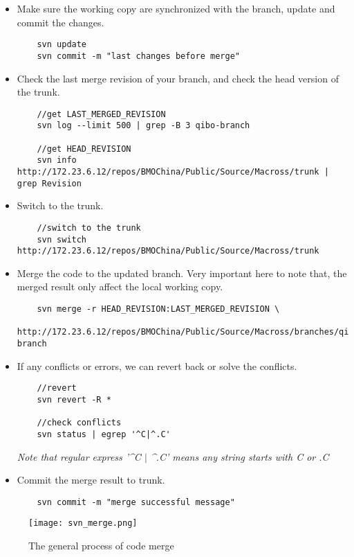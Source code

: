 \begin{itemize}
\item 
	Make sure the working copy are synchronized with the branch, update and commit the changes.
	\begin{lstlisting}
	svn update 
	svn commit -m "last changes before merge"
	\end{lstlisting}

\item 
	Check the last merge revision of your branch, and check the head version of the trunk.
	\begin{lstlisting}
	//get LAST_MERGED_REVISION
	svn log --limit 500 | grep -B 3 qibo-branch
	
	//get HEAD_REVISION 											  
	svn info http://172.23.6.12/repos/BMOChina/Public/Source/Macross/trunk | grep Revision  
	\end{lstlisting}

\item
	Switch to the trunk.
	\begin{lstlisting}
	//switch to the trunk
	svn switch http://172.23.6.12/repos/BMOChina/Public/Source/Macross/trunk	
	\end{lstlisting}

\item
	Merge the code to the updated branch. Very important here to note that, the merged result only affect the local working copy.
	\begin{lstlisting}
	svn merge -r HEAD_REVISION:LAST_MERGED_REVISION \
	  http://172.23.6.12/repos/BMOChina/Public/Source/Macross/branches/qibo-branch
	\end{lstlisting}

\item
	If any conflicts or errors, we can revert back or solve the conflicts.
	\begin{lstlisting}
	//revert	
	svn revert -R *
	
	//check conflicts
	svn status | egrep '^C|^.C'
	\end{lstlisting}
	\textit{Note that regular express '\^{}C $\vert$ \^{}.C' means any string starts with C or .C}

\item
	Commit the merge result to trunk.
	\begin{lstlisting}
	svn commit -m "merge successful message"
	\end{lstlisting}
\end{itemize}

\begin{figure}[h]
\label{fig:fig_merge}
\begin{center}
\texttt{[image: svn\_merge.png]}
\caption{The general process of code merge}
\end{center}
\end{figure}	


